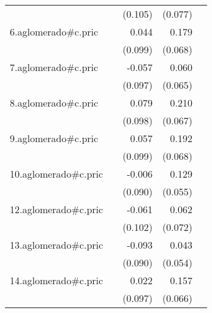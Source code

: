 {\begin{longtable}{l*{4}{D{.}{.}{-1}}}
            &                     &     (0.105)         &     (0.077)         &                     \\
\addlinespace
6.aglomerado#c.pric&                     &       0.044         &       0.179\sym{**} &                     \\
            &                     &     (0.099)         &     (0.068)         &                     \\
\addlinespace
7.aglomerado#c.pric&                     &      -0.057         &       0.060         &                     \\
            &                     &     (0.097)         &     (0.065)         &                     \\
\addlinespace
8.aglomerado#c.pric&                     &       0.079         &       0.210\sym{**} &                     \\
            &                     &     (0.098)         &     (0.067)         &                     \\
\addlinespace
9.aglomerado#c.pric&                     &       0.057         &       0.192\sym{**} &                     \\
            &                     &     (0.099)         &     (0.068)         &                     \\
\addlinespace
10.aglomerado#c.pric&                     &      -0.006         &       0.129\sym{*}  &                     \\
            &                     &     (0.090)         &     (0.055)         &                     \\
\addlinespace
12.aglomerado#c.pric&                     &      -0.061         &       0.062         &                     \\
            &                     &     (0.102)         &     (0.072)         &                     \\
\addlinespace
13.aglomerado#c.pric&                     &      -0.093         &       0.043         &                     \\
            &                     &     (0.090)         &     (0.054)         &                     \\
\addlinespace
14.aglomerado#c.pric&                     &       0.022         &       0.157\sym{*}  &                     \\
            &                     &     (0.097)         &     (0.066)         &                     \\

\end{longtable}}
